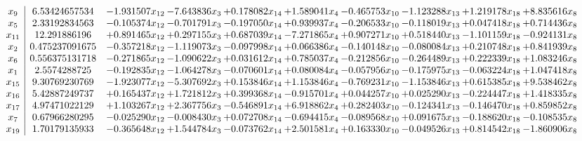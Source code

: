 \documentclass[10pt]{article}
\begin{document}
 \[\begin{array}{c| c c@{\hskip 2pt} c@{\hskip 2pt} c@{\hskip 2pt} c@{\hskip 2pt} c@{\hskip 2pt} c@{\hskip 2pt} c@{\hskip 2pt} c@{\hskip 2pt} }
 x_{9}   &  6.53424657534 & -1.931507 x_{12} & -7.643836 x_{3} & + 0.178082 x_{14} & + 1.589041 x_{4} & -0.465753 x_{10} & -1.123288 x_{13} & + 1.219178 x_{18} & + 8.835616 x_{8}\\
 x_{5}   &  2.33192834563 & -0.105374 x_{12} & -0.701791 x_{3} & -0.197050 x_{14} & + 0.939937 x_{4} & -0.206533 x_{10} & -0.118019 x_{13} & + 0.047418 x_{18} & + 0.714436 x_{8}\\
 x_{11}   &  12.291886196 & + 0.891465 x_{12} & + 0.297155 x_{3} & + 0.687039 x_{14} & -7.271865 x_{4} & + 0.907271 x_{10} & + 0.518440 x_{13} & -1.101159 x_{18} & -0.924131 x_{8}\\
 x_{2}   &  0.475237091675 & -0.357218 x_{12} & -1.119073 x_{3} & -0.097998 x_{14} & + 0.066386 x_{4} & -0.140148 x_{10} & -0.080084 x_{13} & + 0.210748 x_{18} & + 0.841939 x_{8}\\
 x_{6}   &  0.556375131718 & -0.271865 x_{12} & -1.090622 x_{3} & + 0.031612 x_{14} & + 0.785037 x_{4} & -0.212856 x_{10} & -0.264489 x_{13} & + 0.222339 x_{18} & + 1.083246 x_{8}\\
 x_{1}   &  2.5574288725 & -0.192835 x_{12} & -1.064278 x_{3} & -0.070601 x_{14} & + 0.080084 x_{4} & -0.057956 x_{10} & -0.175975 x_{13} & -0.063224 x_{18} & + 1.047418 x_{8}\\
 x_{15}   &  9.30769230769 & -1.923077 x_{12} & -5.307692 x_{3} & + 0.153846 x_{14} & + 1.153846 x_{4} & -0.769231 x_{10} & -1.153846 x_{13} & + 0.615385 x_{18} & + 9.538462 x_{8}\\
 x_{16}   &  5.42887249737 & + 0.165437 x_{12} & + 1.721812 x_{3} & + 0.399368 x_{14} & -0.915701 x_{4} & + 0.044257 x_{10} & + 0.025290 x_{13} & -0.224447 x_{18} & + 1.418335 x_{8}\\
 x_{17}   &  4.97471022129 & + 1.103267 x_{12} & + 2.367756 x_{3} & -0.546891 x_{14} & + 6.918862 x_{4} & + 0.282403 x_{10} & -0.124341 x_{13} & -0.146470 x_{18} & + 0.859852 x_{8}\\
 x_{7}   &  0.67966280295 & -0.025290 x_{12} & -0.008430 x_{3} & + 0.072708 x_{14} & -0.694415 x_{4} & -0.089568 x_{10} & + 0.091675 x_{13} & -0.188620 x_{18} & -0.108535 x_{8}\\
 x_{19}   &  1.70179135933 & -0.365648 x_{12} & + 1.544784 x_{3} & -0.073762 x_{14} & + 2.501581 x_{4} & + 0.163330 x_{10} & -0.049526 x_{13} & + 0.814542 x_{18} & -1.860906 x_{8}\\

\end{array}\]
\end{document}
